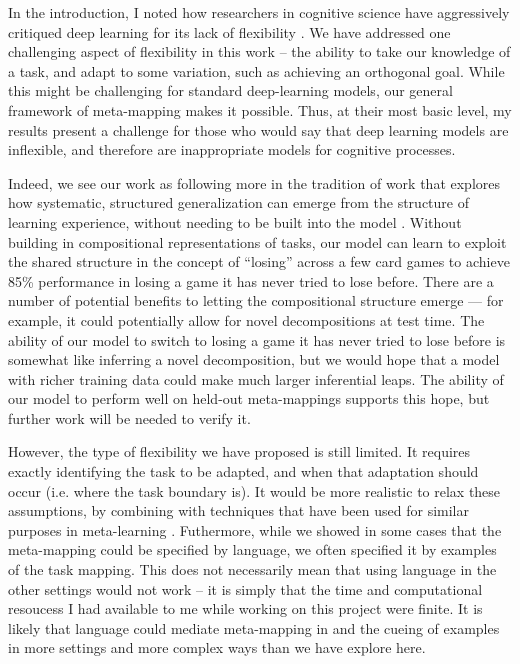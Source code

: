 In the introduction, I noted how researchers in cognitive science have aggressively critiqued deep learning for its lack of flexibility \citep[e.g.][]{Lake2015, Lake2016, Lake2017, Marcus2018}. We have addressed one challenging aspect of flexibility in this work -- the ability to take our knowledge of a task, and adapt to some variation, such as achieving an orthogonal goal. While this might be challenging for standard deep-learning models, our general framework of meta-mapping makes it possible. Thus, at their most basic level, my results present a challenge for those who would say that deep learning models are inflexible, and therefore are inappropriate models for cognitive processes. \par  
Indeed, we see our work as following more in the tradition of work that explores how systematic, structured generalization can emerge from the structure of learning experience, without needing to be built into the model \citep{McClelland2010a, McClelland2010, Hansen2017}. Without building in compositional representations of tasks, our model can learn to exploit the shared structure in the concept of ``losing'' across a few card games to achieve 85\% performance in losing a game it has never tried to lose before. There are a number of potential benefits to letting the compositional structure emerge --- for example, it could potentially allow for novel decompositions at test time. The ability of our model to switch to losing a game it has never tried to lose before is somewhat like inferring a novel decomposition, but we would hope that a model with richer training data could make much larger inferential leaps. The ability of our model to perform well on held-out meta-mappings supports this hope, but further work will be needed to verify it. \par
However, the type of flexibility we have proposed is still limited. It requires exactly identifying the task to be adapted, and when that adaptation should occur (i.e. where the task boundary is). It would be more realistic to relax these assumptions, by combining with techniques that have been used for similar purposes in meta-learning \citep[e.g.][]{Nagabandi2019}. Futhermore, while we showed in some cases that the meta-mapping could be specified by language, we often specified it by examples of the task mapping. This does not necessarily mean that using language in the other settings would not work -- it is simply that the time and computational resoucess I had available to me while working on this project were finite. It is likely that language could mediate meta-mapping in and the cueing of examples in more settings and more complex ways than we have explore here.\par 
